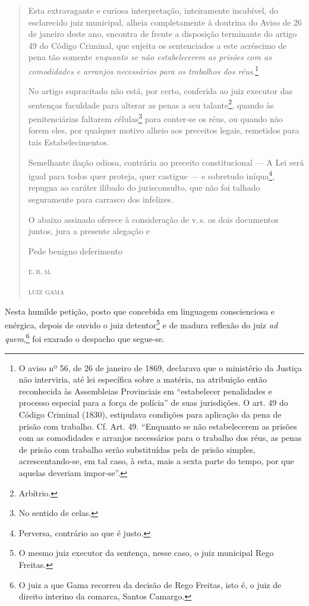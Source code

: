 \begin{quote}
Esta extravagante e curiosa interpretação, inteiramente incabível, do
esclarecido juiz municipal, alheia completamente à doutrina do Aviso de
26 de janeiro deste ano, encontra de frente a disposição terminante do
artigo 49 do Código Criminal, que sujeita os sentenciados a este
acréscimo de pena tão somente \emph{enquanto se não estabelecerem as
prisões com as comodidades e arranjos necessários para os trabalhos dos
réus}.\footnote{O aviso nº 56, de 26 de janeiro de 1869, declarava que o
  ministério da Justiça não interviria, até lei específica sobre a
  matéria, na atribuição então reconhecida às Assembleias Provinciais em
  ``estabelecer penalidades e processo especial para a força de polícia''
  de suas jurisdições. O art. 49 do Código Criminal (1830), estipulava
  condições para aplicação da pena de prisão com trabalho. Cf. Art. 49.
  ``Enquanto se não estabelecerem as prisões com as comodidades e
  arranjos necessários para o trabalho dos réus, as penas de prisão com
  trabalho serão substituídas pela de prisão simples, acrescentando-se,
  em tal caso, à esta, mais a sexta parte do tempo, por que aquelas
  deveriam impor-se''.}

No artigo supracitado não está, por certo, conferida ao juiz executor
das sentenças faculdade para alterar as penas a seu talante\footnote{
  Arbítrio.}, quando às penitenciárias faltarem células\footnote{No
  sentido de celas.} para conter-se os réus, ou quando não forem eles,
por qualquer motivo alheio aos preceitos legais, remetidos para tais
Estabelecimentos.

Semelhante ilação odiosa, contrária ao preceito constitucional --- A Lei
será igual para todos quer proteja, quer castigue --- e sobretudo
iníqua\footnote{Perversa, contrário ao que é justo.}, repugna ao
caráter ilibado do jurisconsulto, que não foi talhado seguramente para
carrasco dos infelizes.

O abaixo assinado oferece à consideração de v.\,s. os dois documentos
juntos, jura a presente alegação e

\begin{flushright}
Pede benigno deferimento

\textsc{e.\,r.\,m.}

\textsc{luiz gama}
\end{flushright}
\end{quote}

Nesta humilde petição, posto que concebida em linguagem conscienciosa e
enérgica, depois de ouvido o juiz detentor\footnote{O mesmo juiz
  executor da sentença, nesse caso, o juiz municipal Rego Freitas.} e de
madura reflexão do juiz \emph{ad quem},\footnote{O juiz a que Gama
  recorreu da decisão de Rego Freitas, isto é, o juiz de direito
  interino da comarca, Santos Camargo.} foi exarado o despacho que
segue-se.

